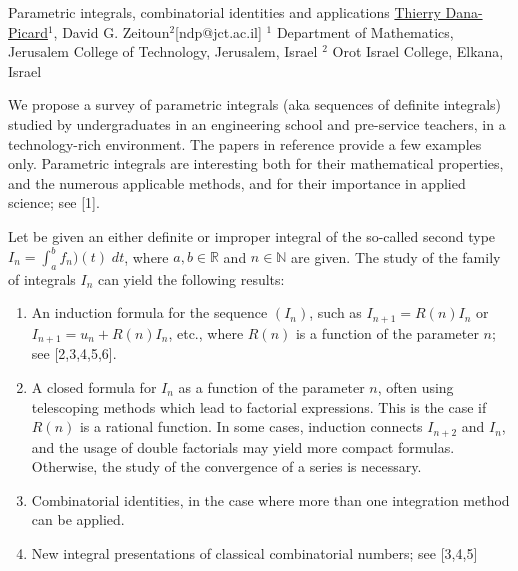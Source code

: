 


\begin{abstract_online}{Parametric integrals, combinatorial identities and applications}{%
        \underline{Thierry Dana-Picard}$^{1}$, David G. Zeitoun$^{2}$}{[ndp@jct.ac.il]
        }{%
        $^1$ Department of Mathematics, Jerusalem College of Technology, Jerusalem, Israel \newline{}$^2$ Orot Israel College, Elkana, Israel \newline{}}

We propose a survey of parametric integrals (aka sequences of definite integrals) studied by undergraduates in an engineering school and pre-service teachers, in a technology-rich environment.  The papers in reference provide a few examples only. Parametric integrals are interesting both for their mathematical properties, and the numerous applicable methods, and for their importance in applied science; see [1].

Let be given an either definite or improper integral of the so-called second type $I_n=\int_a^b f_n)(t) \; dt$, where $a,b \in \mathbb{R}$ and $n \in \mathbb{N}$ are given. The study of the family of integrals $I_n$ can yield the following results:
\begin{enumerate}
\item An induction formula for the sequence $(I_n)$, such as $I_{n+1}=R(n)I_n$ or $I_{n+1}=u_n+R(n)I_n$, etc., where $R(n)$ is a function of the parameter $n$; see [2,3,4,5,6].
\item A closed formula for $I_n$ as a function of the parameter $n$, often using telescoping methods which lead to factorial expressions. This is the case if $R(n)$ is a rational function. In some cases, induction connects $I_{n+2}$ and $I_n$, and the usage of double factorials may yield more compact formulas. Otherwise, the study of the convergence of a series is necessary.
\item Combinatorial identities, in the case where more than one integration method can be applied.
\item New integral presentations of classical combinatorial numbers; see [3,4,5] 
\end{enumerate}


\end{abstract_online}
